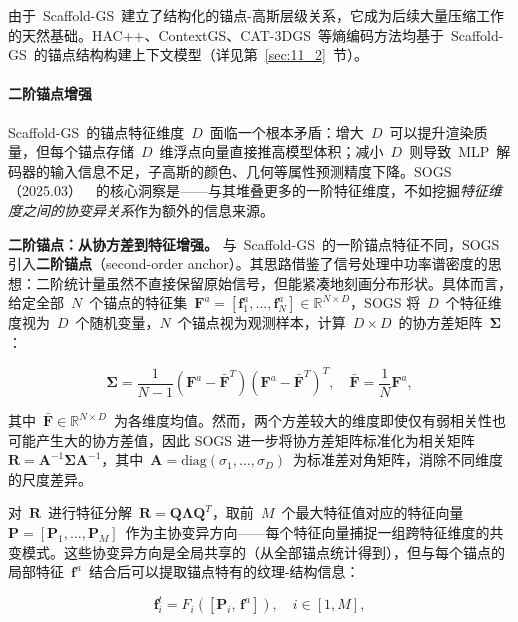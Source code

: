 由于~Scaffold-GS~建立了结构化的锚点-高斯层级关系，它成为后续大量压缩工作的天然基础。HAC++、ContextGS、CAT-3DGS~等熵编码方法均基于~Scaffold-GS~的锚点结构构建上下文模型（详见第~\ref{sec:11_2}~节）。

\paragraph{二阶锚点增强}

Scaffold-GS~的锚点特征维度~$D$~面临一个根本矛盾：增大~$D$~可以提升渲染质量，但每个锚点存储~$D$~维浮点向量直接推高模型体积；减小~$D$~则导致~MLP~解码器的输入信息不足，子高斯的颜色、几何等属性预测精度下降。SOGS（2025.03）~\cite{2503_07476}~的核心洞察是——与其堆叠更多的一阶特征维度，不如挖掘\emph{特征维度之间的协变异关系}作为额外的信息来源。

\textbf{二阶锚点：从协方差到特征增强。}
与~Scaffold-GS~的一阶锚点特征不同，SOGS 引入\textbf{二阶锚点}（second-order anchor）。其思路借鉴了信号处理中功率谱密度的思想：二阶统计量虽然不直接保留原始信号，但能紧凑地刻画分布形状。具体而言，给定全部~$N$~个锚点的特征集~$\mathbf{F}^a = [\mathbf{f}_1^a, \ldots, \mathbf{f}_N^a] \in \mathbb{R}^{N \times D}$，SOGS 将~$D$~个特征维度视为~$D$~个随机变量，$N$~个锚点视为观测样本，计算~$D \times D$~的协方差矩阵~$\boldsymbol{\Sigma}$：

\begin{equation}
\boldsymbol{\Sigma} = \frac{1}{N-1}(\mathbf{F}^a - \bar{\mathbf{F}}^T)(\mathbf{F}^a - \bar{\mathbf{F}}^T)^T, \quad \bar{\mathbf{F}} = \frac{1}{N}\mathbf{F}^a,
\end{equation}

其中~$\bar{\mathbf{F}} \in \mathbb{R}^{N \times D}$~为各维度均值。然而，两个方差较大的维度即使仅有弱相关性也可能产生大的协方差值，因此 SOGS 进一步将协方差矩阵标准化为相关矩阵~$\mathbf{R} = \mathbf{A}^{-1} \boldsymbol{\Sigma} \mathbf{A}^{-1}$，其中~$\mathbf{A} = \text{diag}(\sigma_1, \ldots, \sigma_D)$~为标准差对角矩阵，消除不同维度的尺度差异。

对~$\mathbf{R}$~进行特征分解~$\mathbf{R} = \mathbf{Q}\boldsymbol{\Lambda}\mathbf{Q}^T$，取前~$M$~个最大特征值对应的特征向量~$\mathbf{P} = [\mathbf{P}_1, \ldots, \mathbf{P}_M]$~作为主协变异方向——每个特征向量捕捉一组跨特征维度的共变模式。这些协变异方向是全局共享的（从全部锚点统计得到），但与每个锚点的局部特征~$\mathbf{f}^a$~结合后可以提取锚点特有的纹理-结构信息：

\begin{equation}
\mathbf{f}_i^t = F_i([\mathbf{P}_i, \, \mathbf{f}^a]), \quad i \in [1, M],
\end{equation}

